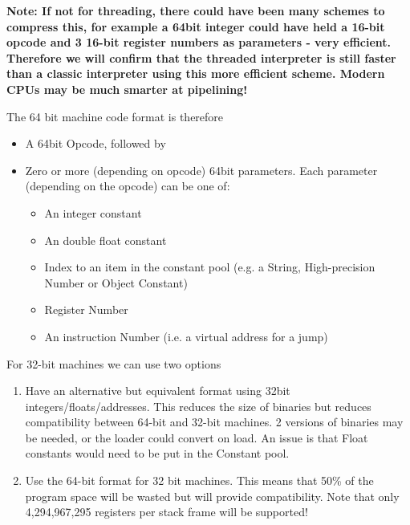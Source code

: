 \textbf{Note: If not for threading, there could have been many schemes to compress this,
for example a 64bit integer could have held a 16-bit opcode and 3 16-bit register
numbers as parameters - very efficient. Therefore we will confirm that the
threaded interpreter is still faster than a classic interpreter using this more
efficient scheme. Modern CPU\textquotesingle{}s may be much smarter at pipelining!}

The 64 bit machine code format is therefore

\begin{itemize}
\item A 64bit Opcode, followed by

\item Zero or more (depending on opcode) 64bit parameters. Each parameter (depending on
the opcode) can be one of:

\begin{itemize}
\item An integer constant

\item An double float constant

\item Index to an item in the constant pool (e.g. a String, High-precision Number
or Object Constant)

\item Register Number

\item An instruction Number (i.e. a virtual address for a jump)

\end{itemize}

\end{itemize}

For 32-bit machines we can use two options

\begin{enumerate}
\item Have an alternative but equivalent format using 32bit integers/floats/addresses.
This reduces the size of binaries but reduces compatibility between 64-bit and
32-bit machines. 2 versions of binaries may be needed, or the loader could convert
on load. An issue is that Float constants would need to be put in the Constant
pool.

\item Use the 64-bit format for 32 bit machines. This means that 50\% of the program
space will be wasted but will provide compatibility. Note that only
4,294,967,295 registers per stack frame will be supported!

\end{enumerate}

